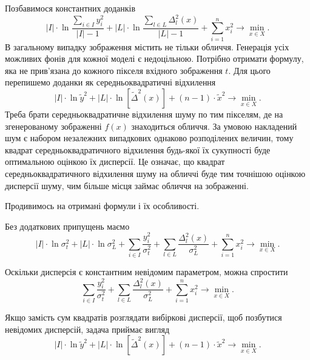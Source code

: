 Позбавимося константних доданків
\begin{equation*}
  \left| I \right|
  \cdot \ln{
    \frac{\sum\limits_{i \in I} y_i^2}
         {\left| I \right| - 1}}
  + \left| L \right|
  \cdot \ln{
    \frac{\sum\limits_{l \in L} \Delta_l^2\left( x \right)}
         {\left| L \right| - 1}}
  + \sum_{i = 1}^n x_i^2
  \to \min\limits_{x \in X}.
\end{equation*}
В загальному випадку зображення містить не тільки обличчя.
Генерація усіх можливих фонів для кожної моделі є недоцільною.
Потрібно отримати формулу,
яка не прив'язана до кожного пікселя вхідного зображення $t$.
Для цього перепишемо доданки як середньоквадратичні відхилення
\begin{equation*}
  \left| I \right|
  \cdot \ln{\widetilde{y}^2}
  + \left| L \right|
  \cdot \ln{\left[ \widetilde{\Delta}^2\left( x \right) \right]}
  + \left( n - 1 \right) \cdot \widetilde{x}^2
  \to \min\limits_{x \in X}.
\end{equation*}
Треба брати середньоквадратичне відхилення шуму по тим пікселям,
де на згенерованому зображенні $f\left( x \right)$ знаходиться обличчя.
За умовою накладений шум є
набором незалежних випадкових однаково розподілених величин,
тому квадрат середньоквадратичного відхилення будь-якої їх сукупності
буде оптимальною оцінкою їх дисперсії.
Це означає, що квадрат середньоквадратичного відхилення шуму
на обличчі буде тим точнішою оцінкою дисперсії шуму,
чим більше місця займає обличчя на зображенні.

Продивимось на отримані формули і їх особливості.

Без додаткових припущень маємо
\begin{equation*}
  \left| I \right| \cdot \ln{\sigma^2_t}
  + \left| L \right| \cdot \ln{\sigma_L^2}
  + \sum_{i \in I} \frac{y_i^2}{\sigma^2_t}
  + \sum_{l \in L} \frac{\Delta_l^2\left( x \right)}{\sigma_L^2}
  + \sum_{i = 1}^n x_i^2
  \to \min\limits_{x \in X}.
\end{equation*}

Оскільки дисперсія є константним невідомим параметром,
можна спростити
\begin{equation}\label{eq:energy:common}
  \sum_{i \in I} \frac{y_i^2}{\sigma^2_t}
  + \sum_{l \in L} \frac{\Delta_l^2\left( x \right)}{\sigma_L^2}
  + \sum_{i = 1}^n x_i^2
  \to \min\limits_{x \in X}.
\end{equation}

Якщо замість сум квадратів розглядати вибіркові дисперсії,
щоб позбутися невідомих дисперсій, задача приймає вигляд
\begin{equation*}
  \left| I \right|
  \cdot \ln{\widetilde{y}^2}
  + \left| L \right|
  \cdot \ln{\left[ \widetilde{\Delta}^2\left( x \right) \right]}
  + \left( n - 1 \right) \cdot \widetilde{x}^2
  \to \min\limits_{x \in X}.
\end{equation*}

